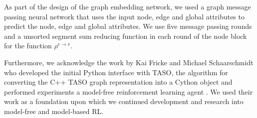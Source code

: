 As part of the design of the graph embedding network, we used a graph message passing neural network \cite{gilmer2017neural} that uses the input node, edge and global attributes to predict the node, edge and global attributes. We use five message passing rounds and a unsorted segment sum reducing function in each round of the node block for the function $\rho^{e\rightarrow v}$.

Furthermore, we acknowledge the work by Kai Fricke and Michael Schaarschmidt who developed the initial Python interface with TASO, the algorithm for converting the C++ TASO graph representation into a Cython object and performed experiments a model-free reinforcement learning agent \cite{xflowrl2019}. We used their work as a foundation upon which we continued development and research into model-free and model-based RL.
